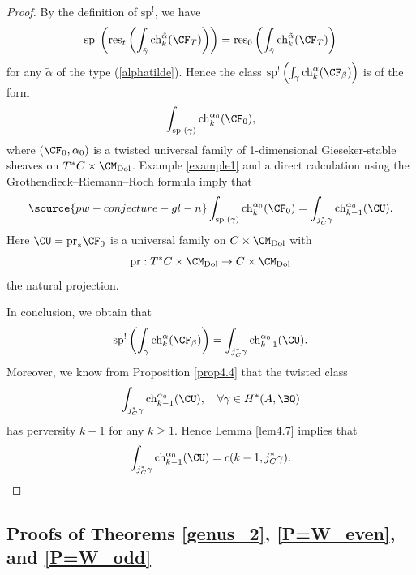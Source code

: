 \begin{proof}
By the definition of $\mathrm{sp}^!$, we have
\[
\mathrm{sp}^!\left( \mathrm{res}_t\left( \int_{\tilde{\gamma}} \mathrm{ch}_k^{\tilde{\alpha}} (\CF_T) \right)\right) = \mathrm{res}_0\left( \int_{\tilde{\gamma}} \mathrm{ch}_k^{\tilde{\alpha}} (\CF_T) \right)
\]
for any $\tilde{\alpha}$ of the type (\ref{alphatilde}). Hence the class $\mathrm{sp}^!\left( \int_{\gamma} \mathrm{ch}_k^\alpha (\CF_\beta) \right)$ is of the form
\[
\int_{\mathrm{sp}^!(\gamma)} \mathrm{ch}_k^{\alpha_0} (\CF_0),
\]
where $(\CF_0, \alpha_0)$ is a twisted universal family of 1-dimensional Gieseker-stable sheaves on $T^*C \times \CM_{\mathrm{Dol}}$. Example \ref{example1} and a direct calculation using the Grothendieck--Riemann--Roch formula imply that
\begin{equation*}\label{997}
\source{pw-conjecture-gl-n}
\int_{\mathrm{sp}^!(\gamma)} \mathrm{ch}_k^{\alpha_0} (\CF_0) = \int_{j_C^*\gamma} \mathrm{ch}_{k-1}^{\alpha_0}(\CU).
\end{equation*}
Here $\CU = \mathrm{pr}_* \CF_0$ is a universal family on $C\times \CM_{\mathrm{Dol}}$ with
\[
\mathrm{pr}: T^*C\times \CM_{\mathrm{Dol}} \to C\times \CM_{\mathrm{Dol}}
\]
the natural projection.

In conclusion, we obtain that
\[
\mathrm{sp}^!\left( \int_{\gamma} \mathrm{ch}_k^\alpha (\CF_\beta) \right) = \int_{j_C^*\gamma} \mathrm{ch}_{k-1}^{\alpha_0}(\CU).
\]
Moreover, we know from Proposition \ref{prop4.4} that the twisted class \[
\int_{j_C^*\gamma} \mathrm{ch}_{k-1}^{\alpha_0}(\CU),\quad \forall \gamma \in H^*(A, \BQ)
\]
has perversity $k-1$ for any $k \geq 1$. Hence Lemma \ref{lem4.7} implies that
\[
\int_{j_C^*\gamma} \mathrm{ch}_{k-1}^{\alpha_0}(\CU) = c(k-1, j_C^*\gamma). \qedhere
\]
\end{proof}

\subsection{Proofs of Theorems \ref{genus_2}, \ref{P=W_even}, and \ref{P=W_odd}}\label{Section4.6}

